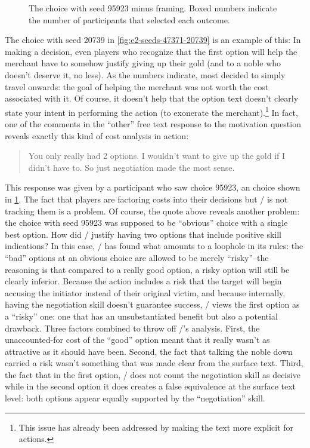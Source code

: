 \begin{figure}[!b]
\caption[``Obvious failure'' choice 95923]{The \obvf{} choice with seed 95923 minus framing. Boxed numbers indicate the number of participants that selected each outcome.}
\label{fig:e2-seed-95923}
\end{figure}


The choice with seed 20739 in \cref{fig:e2-seeds-47371-20739} is an example of this: In making a decision, even players who recognize that the first option will help the merchant have to somehow justify giving up their gold (and to a noble who doesn't deserve it, no less).
%
As the numbers indicate, most decided to simply travel onwards: the goal of helping the merchant was not worth the cost associated with it.
%
Of course, it doesn't help that the option text doesn't clearly state your intent in performing the action (to exonerate the merchant).\footnote{This issue has already been addressed by making the text more explicit for  actions.}
%
In fact, one of the comments in the ``other'' free text response to the motivation question reveals exactly this kind of cost analysis in action:

\begin{quote}
  \quoteshape
You only really had 2 options. I wouldn't want to give up the gold if I didn't have to. So just negotiation made the most sense.
\end{quote}

This response was given by a participant who saw choice 95923, an \obvf{} choice shown in \cref{fig:e2-seed-95923}.
%
The fact that players are factoring costs into their decisions but \dunyazad/ is not tracking them is a problem.
%
Of course, the quote above reveals another problem: the choice with seed 95923 was supposed to be ``obvious'' choice with a single best option.
%
How did \dunyazad/ justify having two options that include positive skill indications?
%
In this case, \dunyazad/ has found what amounts to a loophole in its rules: the ``bad'' options at an obvious choice are allowed to be merely ``risky''--the reasoning is that compared to a really good option, a risky option will still be clearly inferior.
%
Because the  action includes a risk that the target will begin accusing the initiator instead of their original victim, and because internally, having the negotiation skill doesn't guarantee success, \dunyazad/ views the first option as a ``risky'' one: one that has an unsubstantiated benefit but also a potential drawback.
%
Three factors combined to throw off \dunyazad/'s analysis.
%
First, the unaccounted-for cost of the ``good'' option meant that it really wasn't as attractive as it should have been.
%
Second, the fact that talking the noble down carried a risk wasn't something that was made clear from the surface text.
%
Third, the fact that in the first option, \dunyazad/ does not count the negotiation skill as decisive while in the second option it does creates a false equivalence at the surface text level: both options appear equally supported by the ``negotiation'' skill.


